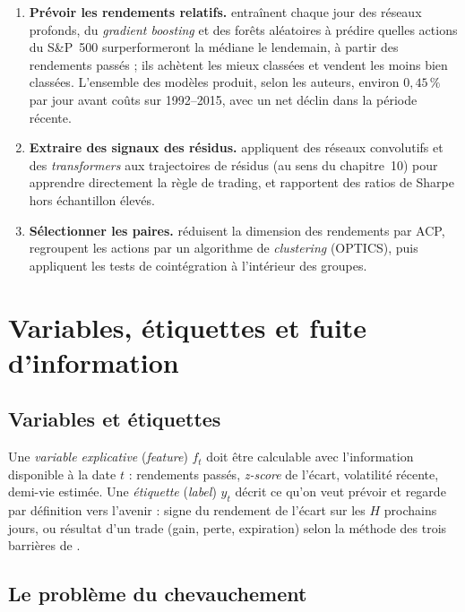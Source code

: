 \begin{enumerate}
\item \textbf{Prévoir les rendements relatifs.} \citet{krauss2017ml} entraînent chaque jour des réseaux profonds, du \emph{gradient boosting} et des forêts aléatoires à prédire quelles actions du S\&P~500 surperformeront la médiane le lendemain, à partir des rendements passés ; ils achètent les mieux classées et vendent les moins bien classées. L'ensemble des modèles produit, selon les auteurs, environ $0{,}45\,\%$ par jour avant coûts sur 1992–2015, avec un net déclin dans la période récente.
\item \textbf{Extraire des signaux des résidus.} \citet{guijarro2021} appliquent des réseaux convolutifs et des \emph{transformers} aux trajectoires de résidus (au sens du chapitre~10) pour apprendre directement la règle de trading, et rapportent des ratios de Sharpe hors échantillon élevés.
\item \textbf{Sélectionner les paires.} \citet{sarmento2020} réduisent la dimension des rendements par ACP, regroupent les actions par un algorithme de \emph{clustering} (OPTICS), puis appliquent les tests de cointégration à l'intérieur des groupes.
\end{enumerate}

\section{Variables, étiquettes et fuite d'information}

\subsection{Variables et étiquettes}

Une \emph{variable explicative} (\emph{feature}) $f_t$ doit être calculable avec l'information disponible à la date $t$ : rendements passés, \emph{z-score} de l'écart, volatilité récente, demi-vie estimée. Une \emph{étiquette} (\emph{label}) $y_t$ décrit ce qu'on veut prévoir et regarde par définition vers l'avenir : signe du rendement de l'écart sur les $H$ prochains jours, ou résultat d'un trade (gain, perte, expiration) selon la méthode des trois barrières de \citet{lopezdeprado2018}.

\subsection{Le problème du chevauchement}

